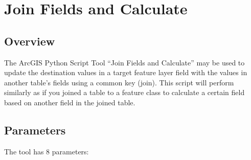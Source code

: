 \documentclass[openany]{book}
\theoremstyle{definition}
\theoremstyle{definition}
\theoremstyle{definition}
\theoremstyle{remark}
\begin{document}
\hypertarget{joinCalc}{\chapter{Join Fields and
Calculate}\label{joinCalc}}

\section{Overview}\label{overview}

The ArcGIS Python Script Tool ``Join Fields and Calculate'' may be used
to update the destination values in a target feature layer field with
the values in another table's fields using a common key (join). This
script will perform similarly as if you joined a table to a feature
class to calculate a certain field based on another field in the joined
table.

\section{Parameters}\label{parameters}

The tool has 8 parameters:
\end{document}
